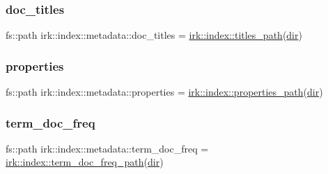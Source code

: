 \mbox{\label{structirk_1_1index_1_1metadata_aae05b9d0a33fd6c90f7f9be0a359ca77}} 
\subsubsection{\texorpdfstring{doc\+\_\+titles}{doc\_titles}}
{\footnotesize\ttfamily fs\+::path irk\+::index\+::metadata\+::doc\+\_\+titles = \mbox{\hyperlink{namespaceirk_1_1index_a2c4aa814da3f9412179fe44a70fdbe94}{irk\+::index\+::titles\+\_\+path}}(\mbox{\hyperlink{structirk_1_1index_1_1metadata_a355b4325c022cd152e68fc18b1775fc6}{dir}})}

\mbox{\label{structirk_1_1index_1_1metadata_a1501ec5d527da04b74af747230504ee0}} 
\subsubsection{\texorpdfstring{properties}{properties}}
{\footnotesize\ttfamily fs\+::path irk\+::index\+::metadata\+::properties = \mbox{\hyperlink{namespaceirk_1_1index_a5880f03dd72d6ebbae004d2ab83c219e}{irk\+::index\+::properties\+\_\+path}}(\mbox{\hyperlink{structirk_1_1index_1_1metadata_a355b4325c022cd152e68fc18b1775fc6}{dir}})}

\mbox{\label{structirk_1_1index_1_1metadata_a620a29ca94ec440938aa5468c96a68fa}} 
\subsubsection{\texorpdfstring{term\+\_\+doc\+\_\+freq}{term\_doc\_freq}}
{\footnotesize\ttfamily fs\+::path irk\+::index\+::metadata\+::term\+\_\+doc\+\_\+freq = \mbox{\hyperlink{namespaceirk_1_1index_a616162aee34d0fe0460174bab4e8e518}{irk\+::index\+::term\+\_\+doc\+\_\+freq\+\_\+path}}(\mbox{\hyperlink{structirk_1_1index_1_1metadata_a355b4325c022cd152e68fc18b1775fc6}{dir}})}

